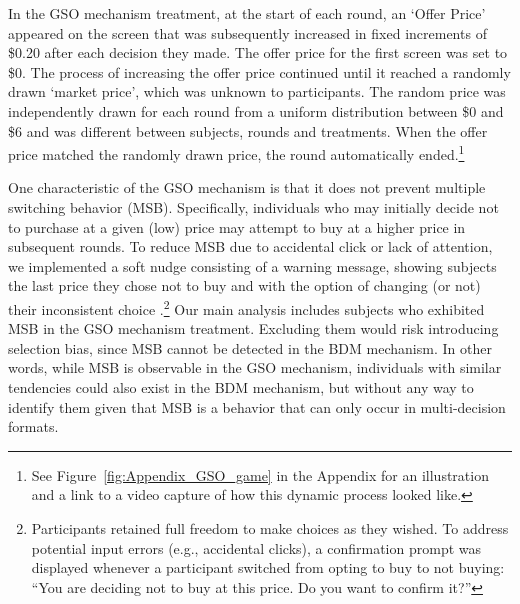 \documentclass[12pt]{article}
\begin{document}
In the GSO mechanism treatment, at the start of each round, an `Offer Price' appeared on the screen that was subsequently increased in fixed increments of \$0.20 after each decision they made. %
The offer price for the first screen was set to \$0. The process of increasing the offer price continued until it reached a randomly drawn `market price', which was unknown to participants. The random price was independently drawn for each round from a uniform distribution between \$0 and \$6 and was different between subjects, rounds and treatments. When the offer price matched the randomly drawn price, the round automatically ended.\footnote{See Figure~\ref{fig:Appendix_GSO_game} in the Appendix for an illustration and a link to a video capture of how this dynamic process looked like.} 



One characteristic of the GSO mechanism is that it does not prevent multiple switching behavior (MSB). Specifically, individuals who may initially decide not to purchase at a given (low) price may attempt to buy at a higher price in subsequent rounds. To reduce MSB due to accidental click or lack of attention, we implemented a soft nudge consisting of a warning message, showing subjects the last price they chose not to buy and with the option of changing (or not) their inconsistent choice \citep{yu2021multiple}.\footnote{Participants retained full freedom to make choices as they wished. To address potential input errors (e.g., accidental clicks), a confirmation prompt was displayed whenever a participant switched from opting to buy to not buying: ``You are deciding not to buy at this price. Do you want to confirm it?''} 
Our main analysis includes subjects who exhibited MSB in the GSO mechanism treatment. Excluding them would risk introducing selection bias, since MSB cannot be detected in the BDM mechanism. In other words, while MSB is observable in the GSO mechanism, individuals with similar tendencies could also exist in the BDM mechanism, but without any way to identify them given that MSB is a behavior that can only occur in multi-decision formats. 

    
\end{document}

